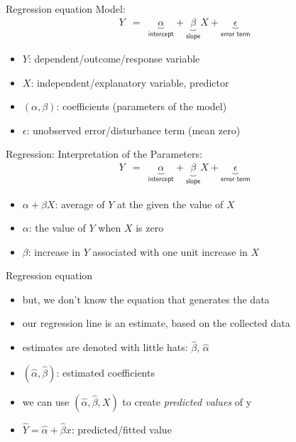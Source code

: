 \documentclass[presentation]{beamer}
\begin{document}
\begin{frame}[label={sec:org188f648}]{Regression equation}
Model:
\begin{eqnarray*}
    Y & = & \underbrace{\alpha}_{\textsf{intercept}} +
            \underbrace{\beta}_{\textsf{slope}}  X +
            \underbrace{\epsilon}_{\textsf{error term}} \label{eq:linear.model}
  \end{eqnarray*}

\begin{itemize}
\item \(Y\): dependent/outcome/response variable
\item \(X\): independent/explanatory variable, predictor
\item \((\alpha, \beta)\): coefficients (parameters of the model)
\item \(\epsilon\): unobserved error/disturbance term (mean zero)
\end{itemize}
\end{frame}

\begin{frame}[label={sec:org732b66c}]{Regression: Interpretation of the Parameters:}
\begin{eqnarray*}
      Y & = & \underbrace{\alpha}_{\textsf{intercept}} +
              \underbrace{\beta}_{\textsf{slope}}  X +
              \underbrace{\epsilon}_{\textsf{error term}} \label{eq:linear.model}
\end{eqnarray*}

\begin{itemize}
\item \(\alpha + \beta X\): average of \(Y\) at the given the value of \(X\)
\item \(\alpha\): the value of \(Y\) when \(X\) is zero
\item \(\beta\): increase in \(Y\) associated with one unit increase in \(X\)
\end{itemize}
\end{frame}


\begin{frame}[label={sec:org1cbd01e}]{Regression equation}
\begin{itemize}
\item but, we don't know the equation that generates the data
\item our regression line is an estimate, based on the collected data
\end{itemize}

\pause

\begin{itemize}
\item estimates are denoted with little hats: \(\hat{\beta}\), \(\hat{\alpha}\)
\item \((\hat\alpha, \hat\beta)\): estimated coefficients
\end{itemize}

\pause
\begin{itemize}
\item we can use \((\hat\alpha, \hat\beta, X)\) to create \emph{predicted values} of y
\item \(\widehat{Y} = \hat\alpha + \hat\beta x\): predicted/fitted value
\end{itemize}
\end{frame}
\end{document}
